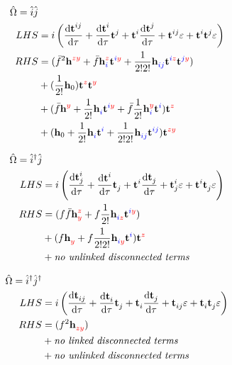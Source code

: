 \documentclass{article}
\newcommand{\bh}{\textbf{h}}
\newcommand{\bt}{\textbf{t}}
\newcommand{\up}[1]{\hat{#1}^{\dagger}}
\newcommand{\down}[1]{\hat{#1}}
\begin{document}
\begin{align}\begin{split}
    \hat{\Omega} = \down{i}\down{j}
\\ LHS &=
    i\left(\dv{\bt^{ij}_{}}{\tau} + \dv{\bt^{i}_{}}{\tau}\bt^{j}_{} + \bt^{i}_{}\dv{\bt^{j}_{}}{\tau} + \bt^{ij}_{}\varepsilon + \bt^{i}_{}\bt^{j}_{}\varepsilon\right)
\\ RHS &=
%
%
(\bar{f}^{2}\bh^{\blue{}\red{zy}}_{\blue{}\red{}} + \bar{f}\bh^{\blue{}\red{z}}_{\blue{i}\red{}}\bt^{\blue{i}\red{y}} + \frac{1}{2!2!}\bh^{\blue{}\red{}}_{\blue{ij}\red{}}\bt^{\blue{i}\red{z}}\bt^{\blue{j}\red{y}})
%
%
\\  &+
%
%
(\frac{1}{2!}\bh_0)\bt^{\blue{}\red{z}}\bt^{\blue{}\red{y}}
    \\  &+  %
(\bar{f}\bh^{\blue{}\red{y}}_{\blue{}\red{}} + \frac{1}{2!}\bh^{\blue{}\red{}}_{\blue{i}\red{}}\bt^{\blue{i}\red{y}} + \bar{f}\frac{1}{2!}\bh^{\blue{}\red{y}}_{\blue{i}\red{}}\bt^{\blue{i}\red{}})\bt^{\blue{}\red{z}}
%
%
\\  &+
%
%
(\bh_0 + \frac{1}{2!}\bh^{\blue{}\red{}}_{\blue{i}\red{}}\bt^{\blue{i}\red{}} + \frac{1}{2!2!}\bh^{\blue{}\red{}}_{\blue{ij}\red{}}\bt^{\blue{ij}\red{}})\bt^{\blue{}\red{zy}}
\end{split}\end{align}

%
%
%
%
%

\begin{align}\begin{split}
    \hat{\Omega} = \up{i}\down{j}
\\ LHS &=
    i\left(\dv{\bt^{i}_{j}}{\tau} + \dv{\bt^{i}_{}}{\tau}\bt^{}_{j} + \bt^{i}_{}\dv{\bt^{}_{j}}{\tau} + \bt^{i}_{j}\varepsilon + \bt^{i}_{}\bt^{}_{j}\varepsilon\right)
\\ RHS &=
%
%
(f\bar{f}\bh^{\blue{}\red{z}}_{\blue{}\red{y}} + f\frac{1}{2!}\bh^{\blue{}\red{}}_{\blue{i}\red{z}}\bt^{\blue{i}\red{y}})
%
%
\\  &+
%
%
(f\bh^{\blue{}\red{}}_{\blue{}\red{y}} + f\frac{1}{2!2!}\bh^{\blue{}\red{}}_{\blue{i}\red{y}}\bt^{\blue{i}\red{}})\bt^{\blue{}\red{z}}
%
%
\\  &+
%
%
    \textit{no unlinked disconnected terms}
\end{split}\end{align}

%
%
%
%
%

\begin{align}\begin{split}
    \hat{\Omega} = \up{i}\up{j}
\\ LHS &=
    i\left(\dv{\bt^{}_{ij}}{\tau} + \dv{\bt^{}_{i}}{\tau}\bt^{}_{j} + \bt^{}_{i}\dv{\bt^{}_{j}}{\tau} + \bt^{}_{ij}\varepsilon + \bt^{}_{i}\bt^{}_{j}\varepsilon\right)
\\ RHS &=
%
%
(f^{2}\bh^{\blue{}\red{}}_{\blue{}\red{zy}})
%
%
\\  &+
%
%
    \textit{no linked disconnected terms}
%
%
\\  &+
%
%
    \textit{no unlinked disconnected terms}
\end{split}\end{align}
\end{document}
